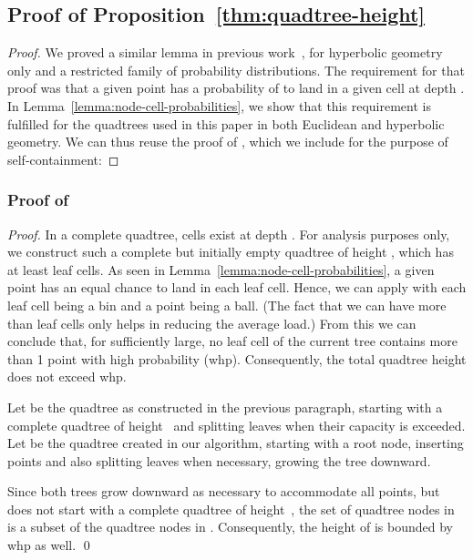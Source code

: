 \documentclass{llncs}
\begin{document}
\subsection{Proof of Proposition~\ref{thm:quadtree-height}}
\label{sub:proof-quadtree-height}
\begin{proof}
We proved a similar lemma in previous work~\cite{Looz2015HRG}, for hyperbolic geometry only and a restricted family of probability distributions.
The requirement for that proof was that a given point  has a probability of  to land in a given cell at depth .
In Lemma~\ref{lemma:node-cell-probabilities}, we show that this requirement is fulfilled for the quadtrees used in this paper in both Euclidean and hyperbolic geometry.
We can thus reuse the proof of \cite[Lemma 2]{Looz2015HRG}, which we include for the purpose of self-containment:
\end{proof}

\subsubsection{Proof of \cite[Lemma 2]{Looz2015HRG}}
\newcommand{\variable}{n}
\newcommand{\binvariable}{n}

\begin{proof} In a complete quadtree,  cells exist at depth . For analysis purposes only, we construct such 
a complete but initially empty quadtree of height , which has at least  leaf cells.
As seen in Lemma~\ref{lemma:node-cell-probabilities}, a given point has an equal chance to land in each leaf cell.
Hence, we can apply \cite[Lemma~6]{Looz2015HRG} with each leaf cell being a bin and a point being a ball.
(The fact that we can have more than  leaf cells only helps in reducing the average load.)
From this we can conclude that, for  sufficiently large, no leaf cell of the current tree contains more than 1 point with high probability (whp).
Consequently, the total quadtree height does not exceed  whp.

Let  be the quadtree as constructed in the previous paragraph, starting with a complete quadtree of height~ and splitting leaves when their capacity is exceeded.
Let  be the quadtree created in our algorithm, starting with a root node, inserting points and also splitting leaves when necessary, growing the tree downward.

Since both trees grow downward as necessary to accommodate all points, but  does not start with a complete quadtree of height~, the set of quadtree nodes in  is a subset of the quadtree nodes in .
Consequently, the height of  is bounded by  whp as well.
\qed	
\end{proof}
\end{document}
